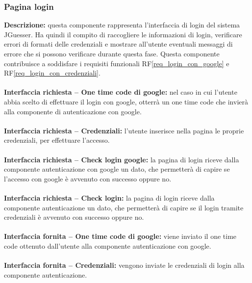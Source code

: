 \subsubsection{Pagina login}
\textbf{Descrizione:} questa componente rappresenta l'interfaccia di login del sistema JGuesser. Ha quindi il compito di raccogliere le informazioni di login, verificare errori di formati delle credenziali e mostrare all'utente eventuali messaggi di errore che si possono verificare durante questa fase. Questa componente contribuisce a soddisfare i requisiti funzionali RF\ref{req_login_con_google} e RF\ref{req_login_con_credenziali}. \\
\\
\textbf{Interfaccia richiesta – One time code di google:} nel caso in cui l'utente abbia scelto di effettuare il login con google, otterrà un one time code che invierà alla componente di autenticazione con google. \\
\\
\textbf{Interfaccia richiesta – Credenziali:} l'utente inserisce nella pagina le proprie credenziali, per effettuare l'accesso. \\
\\
\textbf{Interfaccia richiesta – Check login google:} la pagina di login riceve dalla componente autenticazione con google un dato, che permetterà di capire se l'accesso con google è avvenuto con successo oppure no. \\
\\
\textbf{Interfaccia richiesta – Check login:} la pagina di login riceve dalla componente autenticazione un dato, che permetterà di capire se il login tramite credenziali è avvenuto con successo oppure no. \\
\\
\textbf{Interfaccia fornita – One time code di google:} viene inviato il one time code ottenuto dall'utente alla componente autenticazione con google.\\
\\
\textbf{Interfaccia fornita – Credenziali:} vengono inviate le credenziali di login alla componente autenticazione. \\
\\


